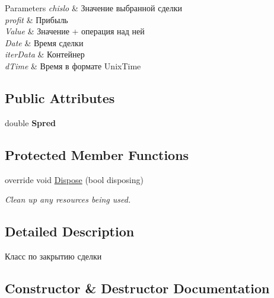 \begin{DoxyCompactItemize}
\begin{DoxyCompactList}
\begin{DoxyParams}{Parameters}
{\em chislo} & Значение выбранной сделки\\
\hline
{\em profit} & Прибыль\\
\hline
{\em Value} & Значение + операция над ней\\
\hline
{\em Date} & Время сделки\\
\hline
{\em iter\+Data} & Контейнер\\
\hline
{\em d\+Time} & Время в формате Unix\+Time\\
\hline
\end{DoxyParams}
\end{DoxyCompactList}\end{DoxyCompactItemize}
\subsection*{Public Attributes}
\begin{DoxyCompactItemize}
\item 
\hypertarget{class_client_1_1_close_deal_ad68485ab502db5b884eff7a204a32c1b}{}\label{class_client_1_1_close_deal_ad68485ab502db5b884eff7a204a32c1b} 
double {\bfseries Spred}
\end{DoxyCompactItemize}
\subsection*{Protected Member Functions}
\begin{DoxyCompactItemize}
\item 
override void \hyperlink{class_client_1_1_close_deal_ac72c1f7f73882a1af7d84ec19ad56bc8}{Dispose} (bool disposing)
\begin{DoxyCompactList}\small\item\em Clean up any resources being used. \end{DoxyCompactList}\end{DoxyCompactItemize}


\subsection{Detailed Description}
Класс по закрытию сделки 



\subsection{Constructor \& Destructor Documentation}
\hypertarget{class_client_1_1_close_deal_a405298882ae55f600ca25b00898159f3}{}\label{class_client_1_1_close_deal_a405298882ae55f600ca25b00898159f3} 
